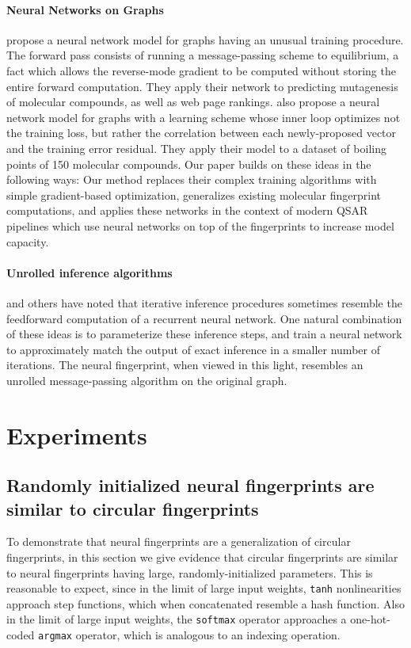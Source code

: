 \documentclass{article}
\begin{document}
\paragraph{Neural Networks on Graphs}
\cite{graphnn2009} propose a neural network model for graphs having an unusual training procedure.
The forward pass consists of running a message-passing scheme to equilibrium, a fact which allows the reverse-mode gradient to be computed without storing the entire forward computation.
They apply their network to predicting mutagenesis of molecular compounds, as well as web page rankings.
\cite{micheli2009neural} also propose a neural network model for graphs with a learning scheme whose inner loop optimizes not the training loss, but rather the correlation between each newly-proposed vector and the training error residual.
They apply their model to a dataset of boiling points of 150 molecular compounds.
Our paper builds on these ideas in the following ways:
Our method replaces their complex training algorithms with simple gradient-based optimization, generalizes existing molecular fingerprint computations, and applies these networks in the context of modern QSAR pipelines which use neural networks on top of the fingerprints to increase model capacity.

\paragraph{Unrolled inference algorithms}
\citet{hershey2014deep} and others have noted that iterative inference procedures sometimes resemble the feedforward computation of a recurrent neural network.
One natural combination of these ideas is to parameterize these inference steps, and train a neural network to approximately match the output of exact inference in a smaller number of iterations.
The neural fingerprint, when viewed in this light, resembles an unrolled message-passing algorithm on the original graph.


\section{Experiments}
\subsection{Randomly initialized neural fingerprints are similar to circular fingerprints}
\label{sec:random is equivalent}
To demonstrate that neural fingerprints are a generalization of circular fingerprints, in this section we give evidence that circular fingerprints are similar to neural fingerprints having large, randomly-initialized parameters.
This is reasonable to expect, since in the limit of large input weights, \texttt{tanh} nonlinearities approach step functions, which when concatenated resemble a hash function.
Also in the limit of large input weights, the \texttt{softmax} operator approaches a one-hot-coded \texttt{argmax} operator, which is analogous to an indexing operation.
\end{document}
